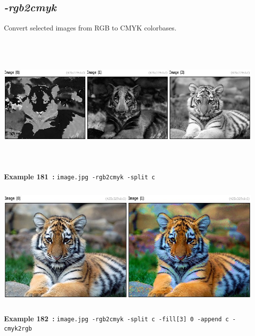 \documentclass[a4paper,11pt,twoside]{book}
\begin{document}
\subsection{\emph{-rgb2cmyk} }\vspace*{-0.5em}
Convert selected images from RGB to CMYK colorbases.
\begin{center}\includegraphics[keepaspectratio=true,height=7cm,width=\textwidth]{img/gmic_def181.jpg}\\
{\footnotesize \textbf{Example 181~:} \texttt{image.jpg -rgb2cmyk -split c}}
\\\includegraphics[keepaspectratio=true,height=7cm,width=\textwidth]{img/gmic_def182.jpg}\\
{\footnotesize \textbf{Example 182~:} \texttt{image.jpg -rgb2cmyk -split c -fill[3] 0 -append c -cmyk2rgb}}
\end{center}
\end{document}
